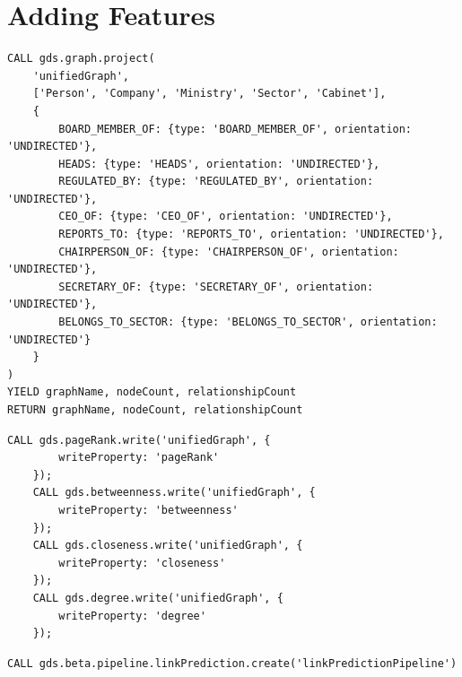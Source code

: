 \documentclass[12pt]{article}
\begin{document}
\section{Adding Features}
\begin{lstlisting}[frame=single]
    CALL gds.graph.project(
    'unifiedGraph',
    ['Person', 'Company', 'Ministry', 'Sector', 'Cabinet'],
    {
        BOARD_MEMBER_OF: {type: 'BOARD_MEMBER_OF', orientation: 'UNDIRECTED'},
        HEADS: {type: 'HEADS', orientation: 'UNDIRECTED'},
        REGULATED_BY: {type: 'REGULATED_BY', orientation: 'UNDIRECTED'},
        CEO_OF: {type: 'CEO_OF', orientation: 'UNDIRECTED'},
        REPORTS_TO: {type: 'REPORTS_TO', orientation: 'UNDIRECTED'},
        CHAIRPERSON_OF: {type: 'CHAIRPERSON_OF', orientation: 'UNDIRECTED'},
        SECRETARY_OF: {type: 'SECRETARY_OF', orientation: 'UNDIRECTED'},
        BELONGS_TO_SECTOR: {type: 'BELONGS_TO_SECTOR', orientation: 'UNDIRECTED'}
    }
)
YIELD graphName, nodeCount, relationshipCount
RETURN graphName, nodeCount, relationshipCount
\end{lstlisting}
\begin{lstlisting}[frame=single]
    CALL gds.pageRank.write('unifiedGraph', {
        writeProperty: 'pageRank'
    });
    CALL gds.betweenness.write('unifiedGraph', {
        writeProperty: 'betweenness'
    });
    CALL gds.closeness.write('unifiedGraph', {
        writeProperty: 'closeness'
    });
    CALL gds.degree.write('unifiedGraph', {
        writeProperty: 'degree'
    });
\end{lstlisting}
\begin{lstlisting}[frame=single]
    CALL gds.beta.pipeline.linkPrediction.create('linkPredictionPipeline')
\end{lstlisting}
\pagebreak
\end{document}
